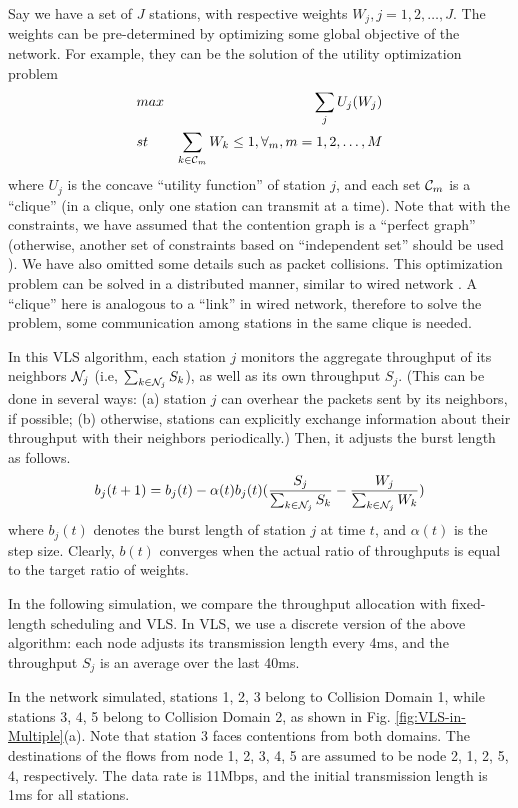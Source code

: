 \documentclass[letterpaper, 10 pt, conference]{ieeeconf}
\begin{document}
Say we have a set of $J$ stations, with respective weights $W_{j},j=1,2,\dots,J$.
The weights can be pre-determined by optimizing some global objective
of the network. For example, they can be the solution of the utility
optimization problem \cite{kelly97charging}\cite{tutorial_wireless}
\begin{eqnarray*}
 & max & \sum_{j}U_{j}(W_{j})\\
 & st & \sum_{k\in{\cal C}_{m}}W_{k}\le1,\forall{}_{m},m=1,2,\dots,M\end{eqnarray*}
where $U_{j}$ is the concave {}``utility function'' of station
$j$, and each set ${\cal C}_{m}$ is a {}``clique'' (in a clique,
only one station can transmit at a time). Note that with the constraints, we
have assumed that the contention graph is a ``perfect graph'' \cite{ad_hoc_constraints} (otherwise, another set of constraints based on ``independent set'' should be used \cite{ad_hoc_constraints}).
We have also omitted some details such as packet collisions. This optimization
problem can be solved in a distributed manner, similar to wired network
\cite{kelly97charging}. A {}``clique'' here is analogous to a {}``link''
in wired network, therefore to solve the problem, some communication
among stations in the same clique is needed.

In this VLS algorithm, each station $j$ monitors the aggregate throughput
of its neighbors ${\cal N}_{j}$ (i.e, $\sum_{k\in{\cal N}_{j}}S_{k}$),
as well as its own throughput $S_{j}$. (This can be done in several
ways: (a) station $j$ can overhear the packets sent by its neighbors,
if possible; (b) otherwise, stations can explicitly exchange information
about their throughput with their neighbors periodically.) Then, it
adjusts the burst length as follows.\[
b_{j}(t+1)=b_{j}(t)-\alpha(t)b_{j}(t)(\frac{S_{j}}{\sum_{k\in{\cal N}_{j}}S_{k}}-\frac{W_{j}}{\sum_{k\in{\cal N}_{j}}W_{k}})\]
where $b_{j}(t)$ denotes the burst length of station $j$ at time
$t$, and $\alpha(t)$ is the step size. Clearly, $b(t)$ converges
when the actual ratio of throughputs is equal to the target ratio
of weights.

In the following simulation, we compare the throughput allocation
with fixed-length scheduling and VLS. In VLS, we use a discrete version
of the above algorithm: each node adjusts its transmission length
every 4ms, and the throughput $S_{j}$ is an average over the last
40ms.

In the network simulated, stations 1, 2, 3 belong to Collision Domain
1, while stations 3, 4, 5 belong to Collision Domain 2, as shown in
Fig. \ref{fig:VLS-in-Multiple}(a). Note that station 3 faces contentions
from both domains. The destinations of the flows from node 1, 2, 
3, 4, 5 are assumed to be node 2, 1, 2, 5, 4, respectively. 
The data rate is 11Mbps, and the initial transmission
length is 1ms for all stations.
\end{document}
